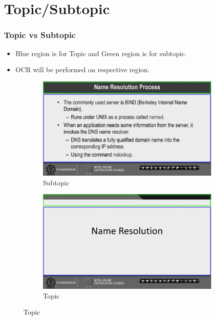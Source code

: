 \documentclass{beamer}
\begin{document}
\section{Topic/Subtopic}
\begin{frame}
\frametitle{Topic vs Subtopic}
	\begin{itemize}
		\item Blue region is for Topic and Green region is for subtopic.
		\item OCR will be performed on respective region.
	\end{itemize}
	\begin{figure}[h!]
		\begin{subfigure}[b]{0.5\textwidth}
			\includegraphics[width=0.95\linewidth]{Presentation_Image/Topic1.jpg}
			\caption{Subtopic}
			\label{fig:subtopic}
		\end{subfigure}%
		\begin{subfigure}[b]{0.5\textwidth}
			\includegraphics[width=0.95\linewidth]{Presentation_Image/Topic2.jpg}
			\caption{Topic}
			\label{fig:topic}
		\end{subfigure}%
	\end{figure}
\end{frame}
\end{document}
